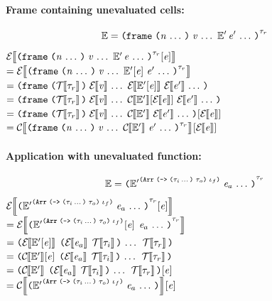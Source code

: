 \begin{sproof}
\paragraph{Frame containing unevaluated cells:}
  \[\ctxt = \notedfrm[\type_r]{\sequence{\val}\,\ctxt'\,\sequence{\expr'}}{\sequence{\nat}}\]
  $\EraseE{\fillc{\notedfrm[\type_r]{\sequence{\val}\,\ctxt'\,\sequence{\expr}}{\sequence{\nat}}}{\expr}}$ \\
  $= \EraseE{\notedfrm[\type_r]{\sequence{\val}\,\fillc{\ctxt'}{\expr}\,\sequence{\expr'}}{\sequence{\nat}}}$ \\
  $= \frm{\sequence{\EraseE{\val}}\,\EraseE{\fillc{\ctxt'}{\expr}}\,\sequence{\EraseE{\expr'}}}{\EraseT{\type_r}}$ \\
  $= \frm{\sequence{\EraseE{\val}}\,\fillc{\EraseC{\ctxt'}}{\EraseE{\expr}}\,\sequence{\EraseE{\expr'}}}{\EraseT{\type_r}}$ \\
  $= \fillc{\frm{\sequence{\EraseE{\val}}\,\EraseC{\ctxt'}\,\sequence{\EraseE{\expr'}}}{\EraseT{\type_r}}}{\EraseE{\expr}}$ \\
  $= \fillc{\EraseC{\notedfrm[\type_r]
      {\sequence{\val}\,\EraseC{\ctxt'}\,\sequence{\expr'}}
      {\sequence{\nat}}}}
  {\EraseE{\expr}}$ \\

\paragraph{Application with unevaluated function:}
  \[\ctxt =
  \notedapp[\type_r]
  {\annotate[\typearray{\typefun{\sequence{\type_i}}{\type_o}}{\idx_f}]{\ctxt'}}
  {\sequence{\expr_a}}\]
  $\EraseE{\fillc
    {\notedapp[\type_r]
      {\annotate[\typearray{\typefun{\sequence{\type_i}}{\type_o}}{\idx_f}]{\ctxt'}}
      {\sequence{\expr_a}}}
    {\expr}}$\\
  $= \EraseE{\notedapp[\type_r]
    {\fillc{\annotate[\typearray{\typefun{\sequence{\type_i}}{\type_o}}{\idx_f}]{\ctxt'}}{\expr}}
    {\sequence{\expr_a}}}$ \\
  $= \app
  {\EraseE{\fillc{\ctxt'}{\expr}}}
  {\sequence{\ttsexp{\EraseE{\expr_a}}{\EraseT{\type_i}}}\;\EraseT{\type_r}}$ \\
  $= \app
  {\fillc{\EraseC{\ctxt'}}{\expr}}
  {\sequence{\ttsexp{\EraseE{\expr_a}}{\EraseT{\type_i}}}\;\EraseT{\type_r}}$ \\
  $= \fillc{\app
    {\EraseC{\ctxt'}}
    {\sequence{\ttsexp{\EraseE{\expr_a}}{\EraseT{\type_i}}}\;\EraseT{\type_r}}}
  {\expr}$ \\
  $= \fillc{\EraseC{\app
      {\annotate[\typearray{\typefun{\sequence{\type_i}}{\type_o}}{\idx_f}]{\ctxt'}}
      {\sequence{\expr_a}}}}
  {\expr}$ \\


\end{sproof}
